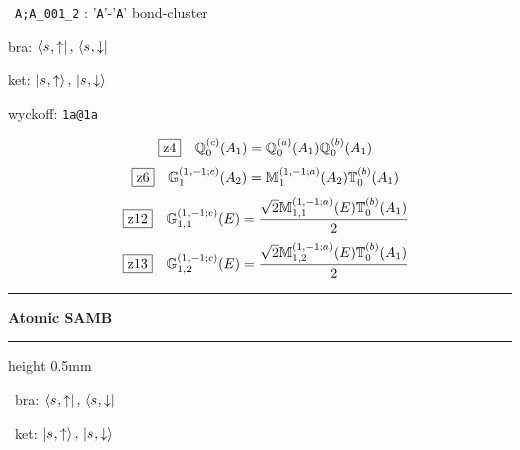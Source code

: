 \documentclass[fleqn,10pt,landscape]{jsarticle}
\begin{document}
\noindent\textbullet\, \texttt{A;A_001_2} : '\texttt{A}'-'\texttt{A}' bond-cluster

\noindent\quad * bra: $\bra{s_{},\uparrow},\, \bra{s_{},\downarrow}$

\noindent\quad * ket: $\ket{s_{},\uparrow},\, \ket{s_{},\downarrow}$

\noindent\quad * wyckoff: \texttt{1a@1a}

\begin{dmath*}
\hspace*{3mm}\fbox{z4}\quad \mathbb{Q}_{0}^{(c)}(A_{1})=\mathbb{Q}_{0}^{(a)}(A_{1}) \mathbb{Q}_{0}^{(b)}(A_{1})
\end{dmath*}
\begin{dmath*}
\hspace*{3mm}\fbox{z6}\quad \mathbb{G}_{1}^{(1,-1;c)}(A_{2})=\mathbb{M}_{1}^{(1,-1;a)}(A_{2}) \mathbb{T}_{0}^{(b)}(A_{1})
\end{dmath*}
\begin{dmath*}
\hspace*{3mm}\fbox{z12}\quad \mathbb{G}_{1,1}^{(1,-1;c)}(E)=\frac{\sqrt{2} \mathbb{M}_{1,1}^{(1,-1;a)}(E) \mathbb{T}_{0}^{(b)}(A_{1})}{2}
\end{dmath*}
\begin{dmath*}
\hspace*{3mm}\fbox{z13}\quad \mathbb{G}_{1,2}^{(1,-1;c)}(E)=\frac{\sqrt{2} \mathbb{M}_{1,2}^{(1,-1;a)}(E) \mathbb{T}_{0}^{(b)}(A_{1})}{2}
\end{dmath*}
\vspace{5mm}

\vspace{5mm}
\noindent \rule[0.5mm]{5mm}{0.5mm}\hspace{3mm}\textbf{Atomic SAMB}\hspace{3mm}\leaders\hrule height 0.5mm\hfill\kern0pt
\vspace{3mm}

\vspace{5mm}

\noindent\textbullet\, bra: $\bra{s_{},\uparrow},\, \bra{s_{},\downarrow}$

\noindent\textbullet\, ket: $\ket{s_{},\uparrow},\, \ket{s_{},\downarrow}$
\end{document}
